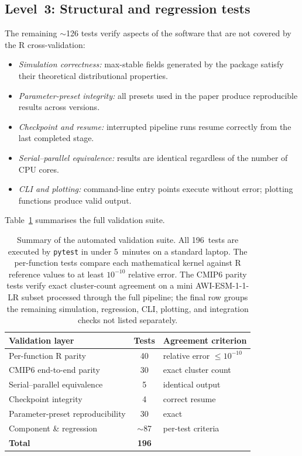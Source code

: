 \documentclass[preprint,12pt,a4paper]{elsarticle}
\begin{document}
{\subsection{Level~3: Structural and regression tests}

The remaining $\sim$126 tests verify aspects of the software that
are not covered by the R cross-validation:
\begin{itemize}
\item \emph{Simulation correctness:} max-stable fields generated by
  the package satisfy their theoretical distributional properties.
\item \emph{Parameter-preset integrity:} all presets used in the
  paper produce reproducible results across versions.
\item \emph{Checkpoint and resume:} interrupted pipeline runs resume
  correctly from the last completed stage.
\item \emph{Serial--parallel equivalence:} results are identical
  regardless of the number of CPU cores.
\item \emph{CLI and plotting:} command-line entry points execute
  without error; plotting functions produce valid output.
\end{itemize}

Table~\ref{tab:validation} summarises the full validation suite.

\begin{table}[!htbp]
\centering
\small
\setlength{\tabcolsep}{5pt}
\begin{tabularx}{\textwidth}{>{\raggedright\arraybackslash}p{4.3cm}c>{\raggedright\arraybackslash}X}
\toprule
\textbf{Validation layer} & \textbf{Tests} &
  \textbf{Agreement criterion} \\
\midrule
Per-function R parity &
  40 & relative error $\leq 10^{-10}$ \\
CMIP6 end-to-end parity &
  30 & exact cluster count \\
Serial--parallel equivalence &
  5 & identical output \\
Checkpoint integrity &
  4 & correct resume \\
Parameter-preset reproducibility &
  30 & exact \\
Component \& regression &
  $\sim$87 & per-test criteria \\
\midrule
\textbf{Total} & \textbf{196} & \\
\bottomrule
\end{tabularx}
\caption{Summary of the automated validation suite. All 196~tests
  are executed by \texttt{pytest} in under 5~minutes on a standard
  laptop. The per-function tests compare each mathematical kernel
  against R reference values to at least $10^{-10}$ relative error.
  The CMIP6 parity tests verify exact cluster-count agreement on a
  mini AWI-ESM-1-1-LR subset processed through the full pipeline;
  the final row groups the remaining simulation, regression, CLI,
  plotting, and integration checks not listed separately.}
\label{tab:validation}
\end{table}}
\end{document}
